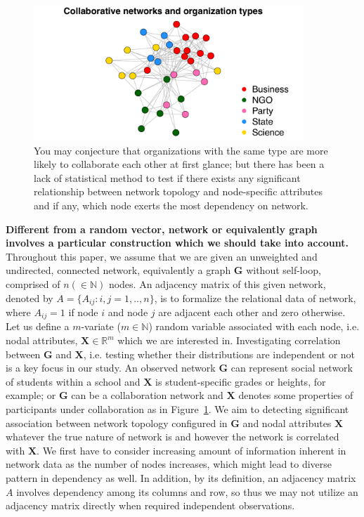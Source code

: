 \documentclass[12pt]{article}
\theoremstyle{definition}
\begin{document}
\begin{figure}[h]
	\centering
	\includegraphics[width=4in]{../Figure/introplot.pdf}	
	\caption{You may conjecture that organizations with the same type are more likely to collaborate each other at first glance; but there has been a lack of statistical method to test if there exists any significant relationship between network topology and node-specific attributes and if any, which node exerts the most dependency on network.}
	\label{fig:intro}
\end{figure}

\textbf{Different from a random vector, network or equivalently graph involves a particular construction which we should take into account.} Throughout this paper, we assume that we are given an unweighted and undirected, connected network, equivalently a graph $\mathbf{G}$ without self-loop, comprised of $n (\in \mathbb{N})$ nodes. An adjacency matrix of this given network, denoted by $A = \{A_{ij} : i,j= 1,..,n \}$, is to formalize the relational data of network, where $A_{ij} = 1$ if node $i$ and node $j$ are adjacent each other and zero otherwise. Let us define a $m$-variate ($m \in \mathbb{N}$) random variable associated with each node, i.e. nodal attributes, $\mathbf{X}  \in \mathbb{R}^{m}$ which we are interested in. Investigating correlation between $\mathbf{G}$ and $\mathbf{X}$, i.e. testing whether their distributions are independent or not is a key focus in our study. An observed network $\mathbf{G}$ can represent social network of students within a school and $\mathbf{X}$ is student-specific grades or heights, for example; or $\mathbf{G}$ can be a collaboration network and $\mathbf{X}$ denotes some properties of participants under collaboration as in Figure~\ref{fig:intro}.  We aim to detecting significant association between network topology configured in $\mathbf{G}$ and nodal attributes $\mathbf{X}$ whatever the true nature of network is and however the network is correlated with $\mathbf{X}$. We first have to consider increasing amount of information inherent in network data as the number of nodes increases, which might lead to diverse pattern in dependency as well. In addition, by its definition, an adjacency matrix $A$ involves dependency among its columns and row, so thus we may not utilize an adjacency matrix directly when required independent observations.
	
\end{document}
